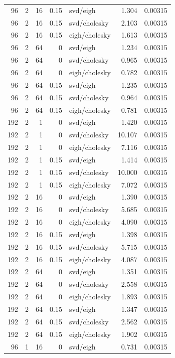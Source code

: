 \begin{tabular}{rrrrlrr}
96 & 2 & 16 & 0.15 & svd/eigh & 1.304 & 0.00315 \\
96 & 2 & 16 & 0.15 & svd/cholesky & 2.103 & 0.00315 \\
96 & 2 & 16 & 0.15 & eigh/cholesky & 1.613 & 0.00315 \\
96 & 2 & 64 & 0 & svd/eigh & 1.234 & 0.00315 \\
96 & 2 & 64 & 0 & svd/cholesky & 0.965 & 0.00315 \\
96 & 2 & 64 & 0 & eigh/cholesky & 0.782 & 0.00315 \\
96 & 2 & 64 & 0.15 & svd/eigh & 1.235 & 0.00315 \\
96 & 2 & 64 & 0.15 & svd/cholesky & 0.964 & 0.00315 \\
96 & 2 & 64 & 0.15 & eigh/cholesky & 0.781 & 0.00315 \\
192 & 2 & 1 & 0 & svd/eigh & 1.420 & 0.00315 \\
192 & 2 & 1 & 0 & svd/cholesky & 10.107 & 0.00315 \\
192 & 2 & 1 & 0 & eigh/cholesky & 7.116 & 0.00315 \\
192 & 2 & 1 & 0.15 & svd/eigh & 1.414 & 0.00315 \\
192 & 2 & 1 & 0.15 & svd/cholesky & 10.000 & 0.00315 \\
192 & 2 & 1 & 0.15 & eigh/cholesky & 7.072 & 0.00315 \\
192 & 2 & 16 & 0 & svd/eigh & 1.390 & 0.00315 \\
192 & 2 & 16 & 0 & svd/cholesky & 5.685 & 0.00315 \\
192 & 2 & 16 & 0 & eigh/cholesky & 4.090 & 0.00315 \\
192 & 2 & 16 & 0.15 & svd/eigh & 1.398 & 0.00315 \\
192 & 2 & 16 & 0.15 & svd/cholesky & 5.715 & 0.00315 \\
192 & 2 & 16 & 0.15 & eigh/cholesky & 4.087 & 0.00315 \\
192 & 2 & 64 & 0 & svd/eigh & 1.351 & 0.00315 \\
192 & 2 & 64 & 0 & svd/cholesky & 2.558 & 0.00315 \\
192 & 2 & 64 & 0 & eigh/cholesky & 1.893 & 0.00315 \\
192 & 2 & 64 & 0.15 & svd/eigh & 1.347 & 0.00315 \\
192 & 2 & 64 & 0.15 & svd/cholesky & 2.562 & 0.00315 \\
192 & 2 & 64 & 0.15 & eigh/cholesky & 1.902 & 0.00315 \\
96 & 1 & 16 & 0 & svd/eigh & 0.731 & 0.00315 \\

\end{tabular}
